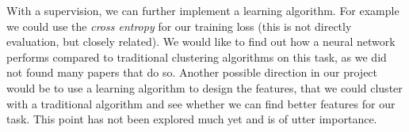 With a supervision, we can further implement a learning algorithm. For example we could use the \textit{cross entropy} for our training loss (this is not directly evaluation, but closely related). We would like to find out how a neural network performs compared to traditional clustering algorithms on this task, as we did not found many papers that do so. Another possible direction in our project would be to use a learning algorithm to design the features, that we could cluster with a traditional algorithm and see whether we can find better features for our task. This point has not been explored much yet and is of utter importance.


\newpage %